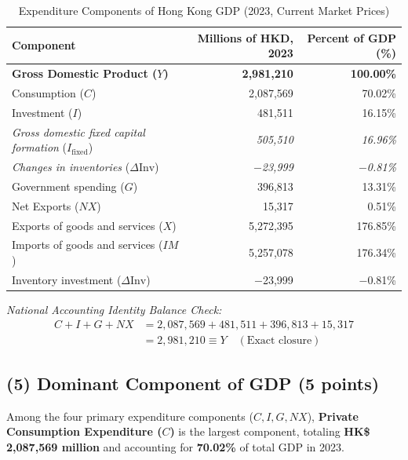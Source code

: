 \documentclass[11pt,a4paper]{article}
\begin{document}
\begin{table}[htbp]
    \centering
    \small
    \caption{Expenditure Components of Hong Kong GDP (2023, Current Market Prices)}
    \label{tab:gdp_composition}
    \begin{tabularx}{0.92\textwidth}{Xrr}
        \toprule
        \textbf{Component} & \textbf{Millions of HKD, 2023} & \textbf{Percent of GDP (\%)} \\
        \midrule
        \textbf{Gross Domestic Product ($Y$)} & \textbf{2,981,210} & \textbf{100.00\%} \\
        \quad Consumption ($C$) & 2,087,569 & 70.02\% \\
        \quad Investment ($I$) & 481,511 & 16.15\% \\
        \qquad \textit{Gross domestic fixed capital formation} ($I_{\text{fixed}}$) & \textit{505,510} & \textit{16.96\%} \\
        \qquad \textit{Changes in inventories} ($\Delta \text{Inv}$) & \textit{$-$23,999} & \textit{$-$0.81\%} \\
        \quad Government spending ($G$) & 396,813 & 13.31\% \\
        \quad Net Exports ($NX$) & 15,317 & 0.51\% \\
        \qquad Exports of goods and services ($X$) & 5,272,395 & 176.85\% \\
        \qquad Imports of goods and services ($IM$) & 5,257,078 & 176.34\% \\
        \midrule
        Inventory investment ($\Delta \text{Inv}$) & $-$23,999 & $-$0.81\% \\
        \bottomrule
    \end{tabularx}
    \vspace{0.4em}
    \begin{minipage}{0.92\textwidth}
        \footnotesize \textit{National Accounting Identity Balance Check:}
        \begin{align*}
            C + I + G + NX &= 2,087,569 + 481,511 + 396,813 + 15,317 \\
            &= 2,981,210 \equiv Y \quad (\text{Exact closure})
        \end{align*}
    \end{minipage}
\end{table}

\subsection*{(5) Dominant Component of GDP (5 points)}
Among the four primary expenditure components ($C, I, G, NX$), \textbf{Private Consumption Expenditure ($C$)} is the largest component, totaling \textbf{HK\$ 2,087,569 million} and accounting for \textbf{70.02\%} of total GDP in 2023.
\end{document}
